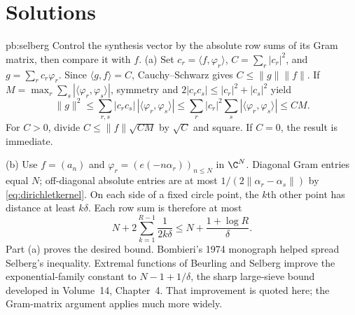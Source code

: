 \section*{Solutions}
\begin{solution}{pb:selberg}
\idea Control the synthesis vector by the absolute row sums of its Gram matrix, then compare it with $f$.
\writeup (a) Set $c_r=\langle f,\varphi_r\rangle$, $C=\sum_r|c_r|^2$, and $g=\sum_rc_r\varphi_r$. Since $\langle g,f\rangle=C$, Cauchy--Schwarz gives $C\le\|g\|\|f\|$. If $M=\max_r\sum_s|\langle\varphi_r,\varphi_s\rangle|$, symmetry and $2|c_rc_s|\le|c_r|^2+|c_s|^2$ yield
\[\|g\|^2\le\sum_{r,s}|c_rc_s|\,|\langle\varphi_r,\varphi_s\rangle|
 \le\sum_r|c_r|^2\sum_s|\langle\varphi_r,\varphi_s\rangle|\le CM.
\]
For $C>0$, divide $C\le\|f\|\sqrt{CM}$ by $\sqrt C$ and square. If $C=0$, the result is immediate.

(b) Use $f=(a_n)$ and $\varphi_r=(e(-n\alpha_r))_{n\le N}$ in $\C^N$. Diagonal Gram entries equal $N$; off-diagonal absolute entries are at most $1/(2\|\alpha_r-\alpha_s\|)$ by \eqref{eq:dirichletkernel}. On each side of a fixed circle point, the $k$th other point has distance at least $k\delta$. Each row sum is therefore at most
\[N+2\sum_{k=1}^{R-1}\frac1{2k\delta}\le N+\frac{1+\log R}{\delta}.
\]
Part (a) proves the desired bound.
\leads Bombieri's 1974 monograph helped spread Selberg's inequality. Extremal functions of Beurling and Selberg improve the exponential-family constant to $N-1+1/\delta$, the sharp large-sieve bound developed in Volume~14, Chapter~4. That improvement is quoted here; the Gram-matrix argument applies much more widely.
\end{solution}

